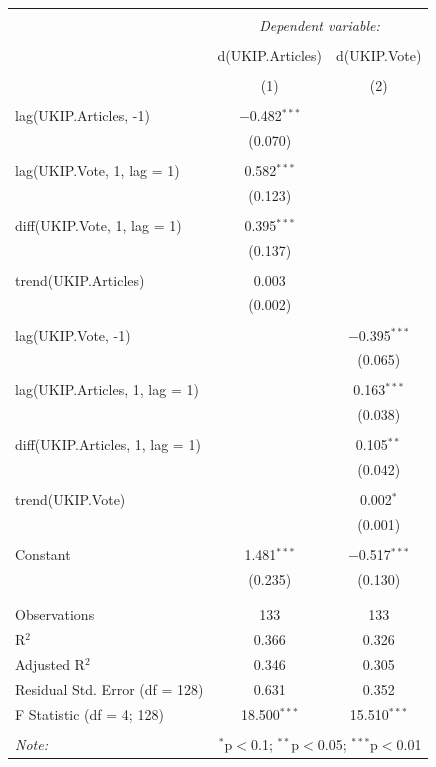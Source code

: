 \documentclass[12pt,article]{article}
\begin{document}
\begin{table}[!htbp] \centering 
  \caption{} 
  \label{} 
\begin{tabular}{@{\extracolsep{5pt}}lcc} 
\\[-1.8ex]\hline 
\hline \\[-1.8ex] 
 & \multicolumn{2}{c}{\textit{Dependent variable:}} \\ 
\cline{2-3} 
\\[-1.8ex] & d(UKIP.Articles) & d(UKIP.Vote) \\ 
\\[-1.8ex] & (1) & (2)\\ 
\hline \\[-1.8ex] 
 lag(UKIP.Articles, -1) & $-$0.482$^{***}$ &  \\ 
  & (0.070) &  \\ 
  & & \\ 
 lag(UKIP.Vote, 1, lag = 1) & 0.582$^{***}$ &  \\ 
  & (0.123) &  \\ 
  & & \\ 
 diff(UKIP.Vote, 1, lag = 1) & 0.395$^{***}$ &  \\ 
  & (0.137) &  \\ 
  & & \\ 
 trend(UKIP.Articles) & 0.003 &  \\ 
  & (0.002) &  \\ 
  & & \\ 
 lag(UKIP.Vote, -1) &  & $-$0.395$^{***}$ \\ 
  &  & (0.065) \\ 
  & & \\ 
 lag(UKIP.Articles, 1, lag = 1) &  & 0.163$^{***}$ \\ 
  &  & (0.038) \\ 
  & & \\ 
 diff(UKIP.Articles, 1, lag = 1) &  & 0.105$^{**}$ \\ 
  &  & (0.042) \\ 
  & & \\ 
 trend(UKIP.Vote) &  & 0.002$^{*}$ \\ 
  &  & (0.001) \\ 
  & & \\ 
 Constant & 1.481$^{***}$ & $-$0.517$^{***}$ \\ 
  & (0.235) & (0.130) \\ 
  & & \\ 
\hline \\[-1.8ex] 
Observations & 133 & 133 \\ 
R$^{2}$ & 0.366 & 0.326 \\ 
Adjusted R$^{2}$ & 0.346 & 0.305 \\ 
Residual Std. Error (df = 128) & 0.631 & 0.352 \\ 
F Statistic (df = 4; 128) & 18.500$^{***}$ & 15.510$^{***}$ \\ 
\hline 
\hline \\[-1.8ex] 
\textit{Note:}  & \multicolumn{2}{r}{$^{*}$p$<$0.1; $^{**}$p$<$0.05; $^{***}$p$<$0.01} \\ 
\end{tabular} 
\end{table}
\end{document}
